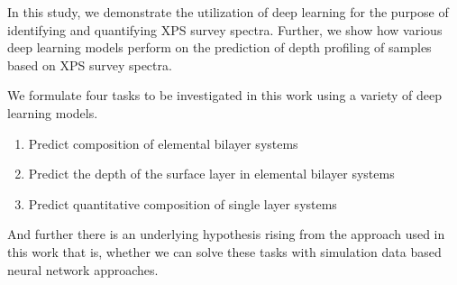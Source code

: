 
In this study, we demonstrate the utilization of deep learning for the purpose of identifying and quantifying XPS survey spectra. Further, we show how various deep learning models perform on the prediction of depth profiling of samples based on XPS survey spectra.

We formulate four tasks to be investigated in this work using a variety of deep learning models.
\begin{enumerate}
    \item Predict composition of elemental bilayer systems
    \item Predict the depth of the surface layer in elemental bilayer systems 
    \item Predict quantitative composition of single layer systems
\end{enumerate}
And further there is an underlying hypothesis rising from the approach used in this work that is, whether we can solve these tasks with simulation data based neural network approaches.




